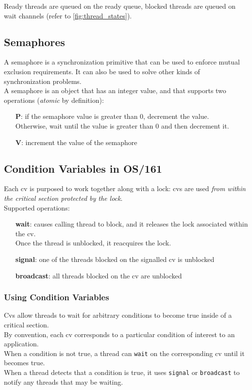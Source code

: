 \documentclass[12pt]{article}
\theoremstyle{plain}
\theoremstyle{definition}
\begin{document}
Ready threads are queued on the ready queue, blocked threads are queued on wait channels (refer to \ref{fig:thread_states}).

\subsection{Semaphores}
A semaphore is a synchronization primitive that can be used to enforce mutual exclusion requirements.
It can also be used to solve other kinds of synchronization problems. \\

A semaphore is an object that has an integer value, and that supports two operations (\emph{atomic} by definition):
\begin{itemize}
  \item[\textbf{P}:] if the semaphore value is greater than 0, decrement the value. \\
  Otherwise, wait until the value is greater than 0 and then decrement it.
  \item[\textbf{V}:] increment the value of the semaphore
\end{itemize}

\subsection{Condition Variables in OS/161}
Each cv is purposed to work together along with a lock: cvs are used \emph{from within the critical section protected by the lock}. \\
Supported operations:
\begin{itemize}
  \item[\textbf{wait}:] causes calling thread to block, and it releases the lock associated within the cv. \\
  Once the thread is unblocked, it reacquires the lock.
  \item[\textbf{signal}:] one of the threads blocked on the signalled cv is unblocked
  \item[\textbf{broadcast}:] all threads blocked on the cv are unblocked
\end{itemize}

\subsubsection{Using Condition Variables}
Cvs allow threads to wait for arbitrary conditions to become true inside of a critical section. \\
By convention, each cv corresponds to a particular condition of interest to an application. \\
When a condition is not true, a thread can \texttt{wait} on the corresponding cv until it becomes true. \\
When a thread detects that a condition is true, it uses \texttt{signal} or \texttt{broadcast} to notify any threads that may be waiting. \\
\end{document}

